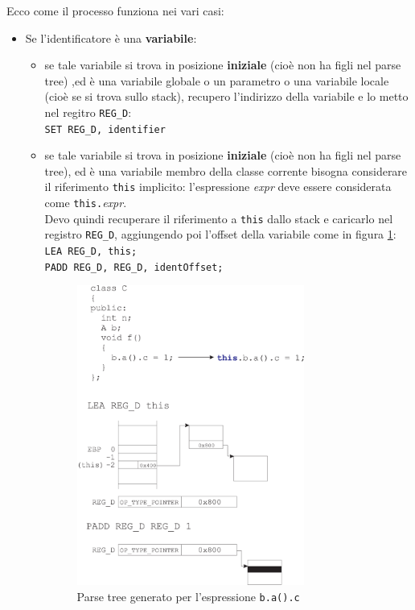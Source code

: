 \documentclass[a4paper, 11pt]{article}
\newcommand{\code}[1]{\scriptsize{\texttt{#1}}\normalsize}
\begin{document}
Ecco come il processo funziona nei vari casi:
\begin{itemize}
\item Se l'identificatore \`e una \textbf{variabile}:
\begin{itemize}
\item se tale variabile si trova in posizione \textbf{iniziale} (cio\`e non ha figli nel parse tree) ,ed \`e una variabile globale o un parametro o una variabile locale (cio\`e se si trova sullo stack), recupero l'indirizzo della variabile e lo metto nel regitro \code{REG\_D}:\\
\code{SET REG\_D, identifier}
\item se tale variabile si trova in posizione \textbf{iniziale} (cio\`e non ha figli nel parse tree), ed \`e una variabile membro della classe corrente bisogna considerare il riferimento \code{this} implicito: l'espressione \emph{expr} deve essere considerata come \code{this.}\emph{expr}.\\
Devo quindi recuperare il riferimento a \code{this} dallo stack e caricarlo nel registro \code{REG\_D}, aggiungendo poi l'offset della variabile come in figura \ref{fig:memberuse}:\\
\code{LEA REG\_D, this;\\
PADD REG\_D, REG\_D, identOffset;}

\begin{figure}[ht]
\centering
\includegraphics[width=0.75\textwidth]{memberuse.eps}
\caption{Parse tree generato per l'espressione \code{b.a().c}}
\label{fig:memberuse}
\end{figure}


\end{itemize}
\end{itemize}
\end{document}
